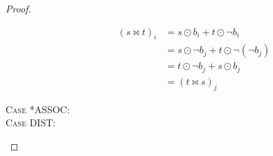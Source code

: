 \begin{proof}
\begin{description}
    \begin{align*}
      (s \bowtie t)_i &= s \odot b_i + t \odot \neg b_i \\
                      &= s \odot \neg b_j + t \odot \neg (\neg b_j) \\
                      &= t \odot \neg b_j + s \odot b_j \\
                      &= (t \bowtie s)_j
    \end{align*}

  \item[\textsc{Case *ASSOC}:]
  \item[\textsc{Case DIST}:]
\end{description}
\end{proof}
